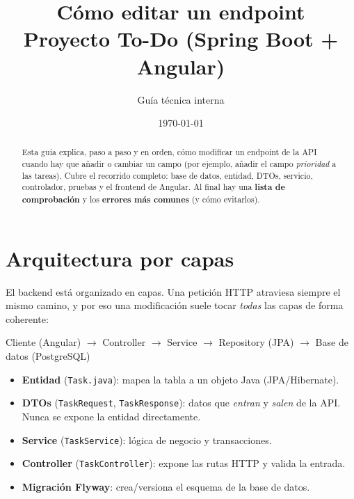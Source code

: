 \documentclass[11pt,a4paper]{article}
\title{\textbf{Cómo editar un endpoint}\\[2pt]
       \large Proyecto To-Do (Spring Boot + Angular)}
\author{Guía técnica interna}
\date{\today}
\newcommand{\archivo}[1]{\texttt{#1}}
\begin{document}
\maketitle

\begin{abstract}
\noindent Esta guía explica, paso a paso y en orden, cómo modificar un endpoint
de la API cuando hay que añadir o cambiar un campo (por ejemplo, añadir el campo
\emph{prioridad} a las tareas). Cubre el recorrido completo: base de datos,
entidad, DTOs, servicio, controlador, pruebas y el frontend de Angular.
Al final hay una \textbf{lista de comprobación} y los \textbf{errores más
comunes} (y cómo evitarlos).
\end{abstract}

\tableofcontents
\vspace{1em}

\section{Arquitectura por capas}
El backend está organizado en capas. Una petición HTTP atraviesa siempre el
mismo camino, y por eso una modificación suele tocar \emph{todas} las capas de
forma coherente:

\begin{center}
\ttfamily
Cliente (Angular) $\rightarrow$ Controller $\rightarrow$ Service $\rightarrow$
Repository (JPA) $\rightarrow$ Base de datos (PostgreSQL)
\end{center}

\begin{itemize}[leftmargin=1.4em]
  \item \textbf{Entidad} (\archivo{Task.java}): mapea la tabla a un objeto Java (JPA/Hibernate).
  \item \textbf{DTOs} (\archivo{TaskRequest}, \archivo{TaskResponse}): datos que
        \emph{entran} y \emph{salen} de la API. Nunca se expone la entidad directamente.
  \item \textbf{Service} (\archivo{TaskService}): lógica de negocio y transacciones.
  \item \textbf{Controller} (\archivo{TaskController}): expone las rutas HTTP y valida la entrada.
  \item \textbf{Migración Flyway}: crea/versiona el esquema de la base de datos.
\end{itemize}
\end{document}
